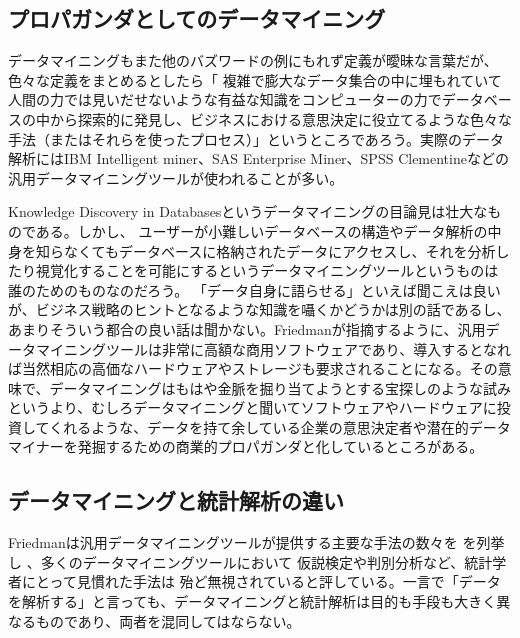 \subsection{プロパガンダとしてのデータマイニング}
データマイニングもまた他のバズワードの例にもれず定義が曖昧な言葉だが、色々な定義をまとめるとしたら「
複雑で膨大なデータ集合の中に埋もれていて人間の力では見いだせないような有益な知識をコンピューターの力でデータベースの中から探索的に発見し、ビジネスにおける意思決定に役立てるような色々な手法（またはそれらを使ったプロセス）」というところであろう。実際のデータ解析にはIBM Intelligent miner、SAS Enterprise Miner、SPSS Clementineなどの汎用データマイニングツールが使われることが多い。

Knowledge Discovery in Databasesというデータマイニングの目論見は壮大なものである。しかし、
ユーザーが小難しいデータベースの構造やデータ解析の中身を知らなくてもデータベースに格納されたデータにアクセスし、それを分析したり視覚化することを可能にするというデータマイニングツールというものは
誰のためのものなのだろう。
「データ自身に語らせる」といえば聞こえは良いが、ビジネス戦略のヒントとなるような知識を囁くかどうかは別の話であるし、あまりそういう都合の良い話は聞かない。Friedmanが指摘するように、汎用データマイニングツールは非常に高額な商用ソフトウェアであり、導入するとなれば当然相応の高価なハードウェアやストレージも要求されることになる。その意味で、データマイニングはもはや金脈を掘り当てようとする宝探しのような試みというより、むしろデータマイニングと聞いてソフトウェアやハードウェアに投資してくれるような、データを持て余している企業の意思決定者や潜在的データマイナーを発掘するための商業的プロパガンダと化しているところがある。

\subsection{データマイニングと統計解析の違い}
Friedmanは汎用データマイニングツールが提供する主要な手法の数々を
を列挙し
、多くのデータマイニングツールにおいて
仮説検定や判別分析など、統計学者にとって見慣れた手法は
殆ど無視されていると評している。一言で「データを解析する」と言っても、データマイニングと統計解析は目的も手段も大きく異なるものであり、両者を混同してはならない。

